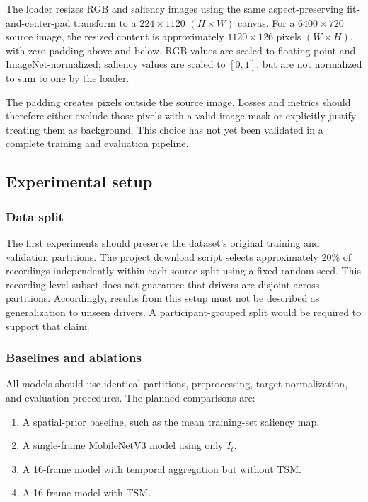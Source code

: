 \documentclass[10pt,twocolumn,letterpaper]{article}
\begin{document}
The loader resizes RGB and saliency images using the same
aspect-preserving fit-and-center-pad transform to a \(224 \times 1120\)
\((H \times W)\) canvas. For a \(6400 \times 720\) source image, the resized
content is approximately \(1120 \times 126\) pixels \((W \times H)\), with
zero padding above and below. RGB values are scaled to floating point and
ImageNet-normalized; saliency values are scaled to \([0,1]\), but are not
normalized to sum to one by the loader.

The padding creates pixels outside the source image. Losses and metrics
should therefore either exclude those pixels with a valid-image mask or
explicitly justify treating them as background. This choice has not yet been
validated in a complete training and evaluation pipeline.

\subsection{Experimental setup}

\subsubsection{Data split}

The first experiments should preserve the dataset's original training and
validation partitions. The project download script selects approximately
20\% of recordings independently within each source split using a fixed
random seed. This recording-level subset does not guarantee that drivers are
disjoint across partitions. Accordingly, results from this setup must not be
described as generalization to unseen drivers. A participant-grouped split
would be required to support that claim.

\subsubsection{Baselines and ablations}

All models should use identical partitions, preprocessing, target
normalization, and evaluation procedures. The planned comparisons are:
\begin{enumerate}
    \item A spatial-prior baseline, such as the mean training-set saliency map.
    \item A single-frame MobileNetV3 model using only \(I_t\).
    \item A 16-frame model with temporal aggregation but without TSM.
    \item A 16-frame model with TSM.
\end{enumerate}
\end{document}
